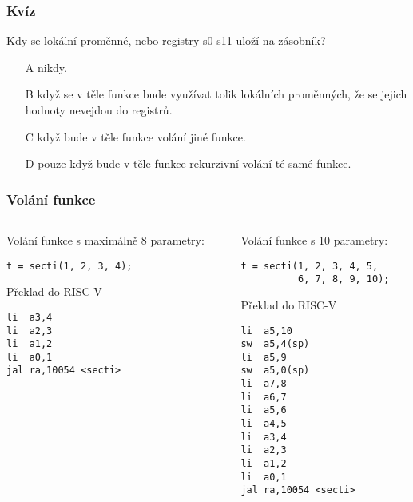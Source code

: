 \documentclass{beamer}
\begin{document}
\begin{frame}
\frametitle{Kvíz}

Kdy se lokální proměnné, nebo registry s0-s11 uloží na zásobník?
\begin{itemize}
 \item[A] nikdy.
 \item[B] když se v těle funkce bude využívat tolik lokálních proměnných, že se jejich hodnoty nevejdou do registrů.
 \item[C] když bude v těle funkce volání jiné funkce.
 \item[D] pouze když bude v těle funkce rekurzivní volání té samé funkce.
\end{itemize}
\end{frame}


\begin{frame}[fragile]
\frametitle{Volání funkce}

\begin{columns}
\begin{column}{0.5\textwidth}
Volání funkce s maximálně 8 parametry:

\begin{verbatim}
t = secti(1, 2, 3, 4);
\end{verbatim}

Překlad do RISC-V
\begin{verbatim}
li  a3,4
li  a2,3
li  a1,2
li  a0,1
jal ra,10054 <secti>
\end{verbatim}

\end{column}
\begin{column}{0.5\textwidth}  
Volání funkce s 10 parametry:

\begin{verbatim}
t = secti(1, 2, 3, 4, 5, 
          6, 7, 8, 9, 10);
\end{verbatim}

Překlad do RISC-V
\begin{verbatim}
li  a5,10
sw  a5,4(sp)
li  a5,9
sw  a5,0(sp)
li  a7,8
li  a6,7
li  a5,6
li  a4,5
li  a3,4
li  a2,3
li  a1,2
li  a0,1
jal ra,10054 <secti>
\end{verbatim}
\end{column}
\end{columns}
\end{frame}
\end{document}
